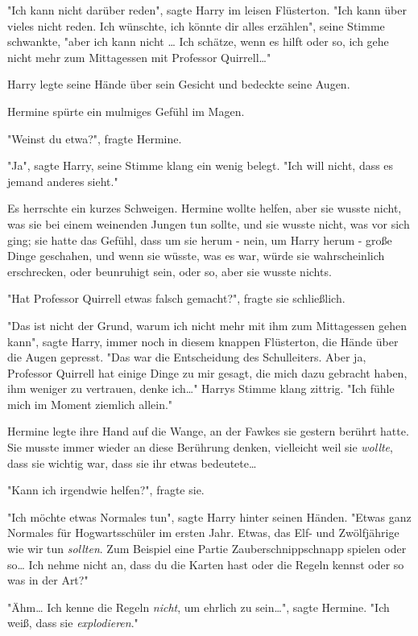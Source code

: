 {"Ich kann nicht darüber reden", sagte Harry im leisen Flüsterton. "Ich kann über vieles nicht reden. Ich wünschte, ich könnte dir alles erzählen", seine Stimme schwankte, "aber ich kann nicht … Ich schätze, wenn es hilft oder so, ich gehe nicht mehr zum Mittagessen mit Professor Quirrell…"

Harry legte seine Hände über sein Gesicht und bedeckte seine Augen.

Hermine spürte ein mulmiges Gefühl im Magen.

"Weinst du etwa?", fragte Hermine.

"Ja", sagte Harry, seine Stimme klang ein wenig belegt. "Ich will nicht, dass es jemand anderes sieht."

Es herrschte ein kurzes Schweigen. Hermine wollte helfen, aber sie wusste nicht, was sie bei einem weinenden Jungen tun sollte, und sie wusste nicht, was vor sich ging; sie hatte das Gefühl, dass um sie herum - nein, um Harry herum - große Dinge geschahen, und wenn sie wüsste, was es war, würde sie wahrscheinlich erschrecken, oder beunruhigt sein, oder so, aber sie wusste nichts.

"Hat Professor Quirrell etwas falsch gemacht?", fragte sie schließlich.

"Das ist nicht der Grund, warum ich nicht mehr mit ihm zum Mittagessen gehen kann", sagte Harry, immer noch in diesem knappen Flüsterton, die Hände über die Augen gepresst. "Das war die Entscheidung des Schulleiters. Aber ja, Professor Quirrell hat einige Dinge zu mir gesagt, die mich dazu gebracht haben, ihm weniger zu vertrauen, denke ich…" Harrys Stimme klang zittrig. "Ich fühle mich im Moment ziemlich allein."

Hermine legte ihre Hand auf die Wange, an der Fawkes sie gestern berührt hatte. Sie musste immer wieder an diese Berührung denken, vielleicht weil sie \emph{wollte}, dass sie wichtig war, dass sie ihr etwas bedeutete…

"Kann ich irgendwie helfen?", fragte sie.

"Ich möchte etwas Normales tun", sagte Harry hinter seinen Händen. "Etwas ganz Normales für Hogwartsschüler im ersten Jahr. Etwas, das Elf- und Zwölfjährige wie wir tun \emph{sollten}. Zum Beispiel eine Partie Zauberschnippschnapp spielen oder so… Ich nehme nicht an, dass du die Karten hast oder die Regeln kennst oder so was in der Art?"

"Ähm… Ich kenne die Regeln \emph{nicht}, um ehrlich zu sein…", sagte Hermine. "Ich weiß, dass sie \emph{explodieren}."

}
